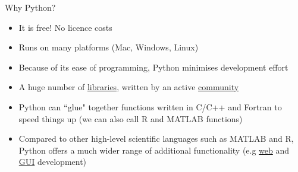 \documentclass[xcolor=table]{beamer}
\begin{document}

\begin{frame}{Why Python?}

\begin{itemize}\addtolength{\itemsep}{0.5\baselineskip}
	\item<1-> It is free! No licence costs
	\item<2-> Runs on many platforms (Mac, Windows, Linux)
	\item<3-> Because of its ease of programming, Python minimises development effort
	\item<4-> A huge number of \href{https://pypi.python.org/pypi}{libraries}, written by an active \href{https://www.python.org/community/}{community}  
	\item<5-> Python can ``glue" together functions written in C/C++ and Fortran to speed things up (we can also call R and MATLAB functions)
	\item<6-> Compared to other high-level scientific languages such as MATLAB and R, Python offers a much wider range of additional functionality (e.g \href{https://www.djangoproject.com/}{web} and \href{https://wiki.python.org/moin/TkInter}{GUI} development) %
\end{itemize}

\end{frame}
\end{document}
